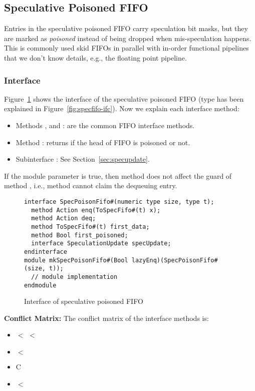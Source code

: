 \subsection{Speculative Poisoned FIFO}\label{sec:specpoisonfifo}

Entries in the speculative poisoned FIFO carry speculation bit masks, but they are marked as \emph{poisoned} instead of being dropped when mis-speculation happens.
This is commonly used skid FIFOs in parallel with in-order functional pipelines that we don't know details, e.g., the floating point pipeline.

\subsubsection{Interface}
Figure~\ref{fig:specpoisonfifo-ifc} shows the interface of the speculative poisoned FIFO (type  has been explained in Figure~\ref{fig:specfifo-ifc}).
Now we explain each interface method:
\begin{itemize}
    \item Methods ,  and : are the common FIFO interface methods.
    \item Method : returns if the head of FIFO is poisoned or not.
    \item Subinterface : See Section~\ref{sec:specupdate}.
\end{itemize}
If the module parameter  is true, then method  does not affect the guard of method , i.e., method  cannot claim the dequeuing entry.

\begin{figure}[t]
\begin{lstlisting}[caption={}]
interface SpecPoisonFifo#(numeric type size, type t);
  method Action enq(ToSpecFifo#(t) x);
  method Action deq;
  method ToSpecFifo#(t) first_data;
  method Bool first_poisoned;
  interface SpeculationUpdate specUpdate;
endinterface
module mkSpecPoisonFifo#(Bool lazyEnq)(SpecPoisonFifo#(size, t));
  // module implementation
endmodule
\end{lstlisting}
\caption{Interface of speculative poisoned FIFO}\label{fig:specpoisonfifo-ifc}
\end{figure}

\noindent\textbf{Conflict Matrix:}
The conflict matrix of the interface methods is:
\begin{itemize}
    \item {} $<$  $<$ 
    \item {} $<$ 
    \item {} C 
    \item {} $<$ 
\end{itemize}

